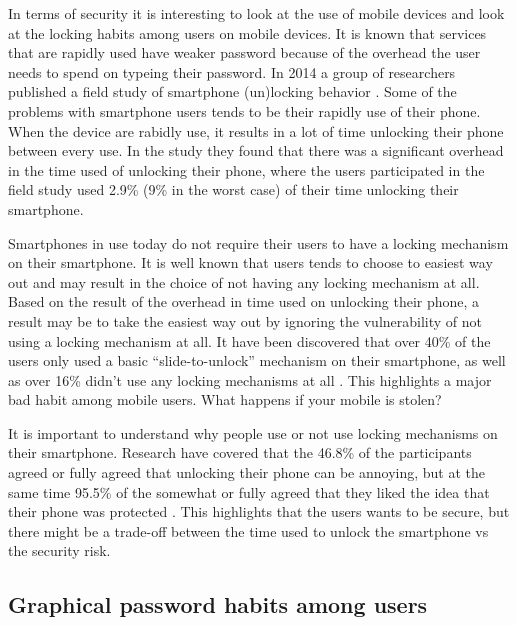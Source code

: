     In terms of security it is interesting to look at the use of mobile devices and look at the locking habits among users on mobile devices. It is known that services that are rapidly used have weaker password because of the overhead the user needs to spend on typeing their password. In 2014 a group of researchers published a field study of smartphone (un)locking behavior \cite{habits3}. Some of the problems with smartphone users tends to be their rapidly use of their phone. When the device are rabidly use, it results in a lot of time unlocking their phone between every use. In the study they found that there was a significant overhead in the time used of unlocking their phone, where the users participated in the field study used 2.9\% (9\% in the worst case) of their time unlocking their smartphone. 
    
    Smartphones in use today do not require their users to have a locking mechanism on their smartphone. It is well known that users tends to choose to easiest way out and may result in the choice of not having any locking mechanism at all. Based on the result of the overhead in time used on unlocking their phone, a result may be to take the easiest way out by ignoring the vulnerability of not using a locking mechanism at all. It have been discovered that over 40\% of the users only used a basic ``slide-to-unlock'' mechanism on their smartphone, as well as over 16\% didn't use any locking mechanisms at all \cite{habits3}. This highlights a major bad habit among mobile users. What happens if your mobile is stolen? 

    It is important to understand why people use or not use locking mechanisms on their smartphone. Research have covered that the 46.8\% of the participants agreed or fully agreed that unlocking their phone can be annoying, but at the same time 95.5\% of the somewhat or fully agreed that they liked the idea that their phone was protected \cite{habits3}. This highlights that the users wants to be secure, but there might be a trade-off between the time used to unlock the smartphone vs the security risk.


    \subsection{Graphical password habits among users}



